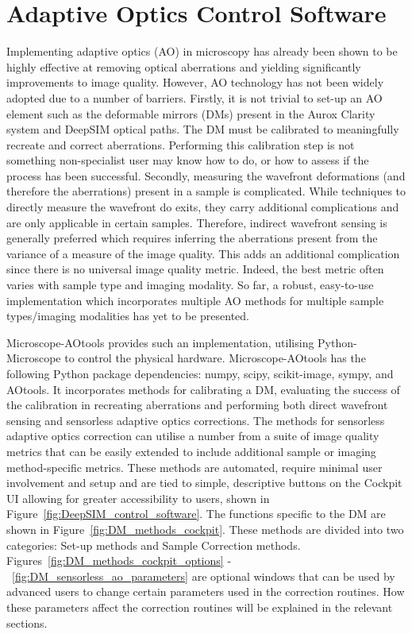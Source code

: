 \chapter{Adaptive Optics Control Software}
\label{chpt:ao_tools}

Implementing adaptive optics (AO) in microscopy has already been shown to be highly effective at removing optical aberrations and yielding significantly improvements to image quality\cite{booth2014adaptive,girkin2009adaptive}. However, AO technology has not been widely adopted due to a number of barriers. Firstly, it is not trivial to set-up an AO element such as the deformable mirrors (DMs) present in the Aurox Clarity system and DeepSIM optical paths. The DM must be calibrated to meaningfully recreate and correct aberrations. Performing this calibration step is not something non-specialist user may know how to do, or how to assess if the process has been successful. Secondly, measuring the wavefront deformations (and therefore the aberrations) present in a sample is complicated. While techniques to directly measure the  wavefront do exits, they carry additional complications and are only applicable in certain samples\cite{wang2014rapid,wang2015direct}. Therefore, indirect wavefront sensing is generally preferred which requires inferring the aberrations present from the variance of a measure of the image quality\cite{rodriguez2018adaptive}. This adds an additional complication since there is no universal image quality metric. Indeed, the best metric often varies with sample type and imaging modality\cite{burke2015adaptive,booth2002adaptive,fienup2003aberration,debarre2008adaptive}. So far, a robust, easy-to-use implementation which incorporates multiple AO methods for multiple sample types/imaging modalities has yet to be presented\cite{ji2017adaptive}.

Microscope-AOtools provides such an implementation, utilising 
Python-Microscope to control the physical hardware. Microscope-AOtools
has the following Python package dependencies: numpy\cite{walt2011numpy},
scipy\cite{virtanen2020scipy}, scikit-image\cite{van2014scikit}, 
sympy\cite{meurer2017sympy}, and AOtools\cite{townson2019aotools}.
It incorporates methods for calibrating a DM, evaluating the success of the calibration in recreating aberrations and performing both direct wavefront sensing and sensorless adaptive optics corrections. The methods for sensorless adaptive optics correction can utilise a number from a suite of image quality metrics that can be easily extended to include additional sample or imaging method-specific metrics. These methods are automated, require minimal user involvement and setup and are tied to simple, descriptive  buttons on the Cockpit UI allowing for greater accessibility to users, shown in Figure~\ref{fig:DeepSIM_control_software}. The functions specific to the DM are shown in Figure~\ref{fig:DM_methods_cockpit}. These methods are divided into two categories: Set-up methods and Sample Correction methods. Figures~\ref{fig:DM_methods_cockpit_options} -~\ref{fig:DM_sensorless_ao_parameters} are optional windows that can be used by advanced users to change certain parameters used in the correction routines. How these parameters affect the correction routines will be explained in the relevant sections.

